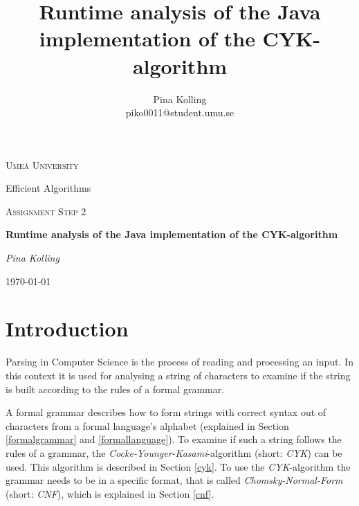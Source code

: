 \documentclass[a4paper, 11pt]{article}
\title{Runtime analysis of the Java implementation of the CYK-algorithm}
\author{Pina Kolling \\ piko0011@student.umu.se}
\begin{document}
\begin{titlepage}
	\centering
	{\scshape\LARGE Ume\r{a} University \par}
	Efficient Algorithms \par
	\vspace{1cm}
	{\scshape\Large Assignment Step 2 \par }
	\vspace{1.5cm}
	{\huge\bfseries  Runtime analysis of the Java implementation of the CYK-algorithm \par}
	\vspace{2cm}
	{\Large\itshape Pina Kolling\par}
	\vfill

	{\large \today\par}
\end{titlepage}















\setcounter{page}{1}


\newpage
\fancyhead[LO]{\empty}
{
  \hypersetup{linkcolor=black}
  \tableofcontents
}




\newpage













\section{Introduction}

Parsing in Computer Science is the process  of reading and processing an input. In this context it is used for analysing a string of characters to examine if the string is built according to the rules of a formal grammar. 

A formal grammar describes how to form strings with correct syntax out of characters from a formal language's alphabet (explained in Section \ref{formalgrammar} and \ref{formallanguage}).
To examine if such a string follows the rules of a grammar, the \textit{Cocke-Younger-Kasami}-algorithm (short: \textit{CYK}) can be used. This algorithm is described in Section \ref{cyk}. To use the \textit{CYK}-algorithm the grammar needs to be in a specific format, that is called \textit{Chomsky-Normal-Form} (short: \textit{CNF}), which is explained in Section \ref{cnf}. \cite{CYK_name, CYK1}
\end{document}
